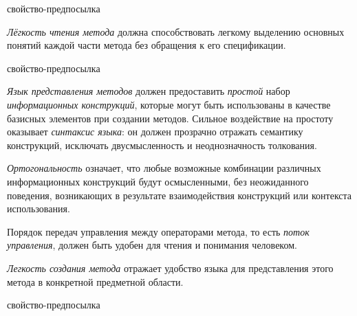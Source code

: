 \begin{SCn}
\begin{scnrelfromlist}{свойство-предпосылка}
\end{scnrelfromlist}
\end{SCn}

\textit{Лёгкость чтения метода} должна способствовать легкому выделению основных понятий каждой части метода без обращения к его спецификации.

\begin{SCn}
\begin{scnrelfromlist}{свойство-предпосылка}
\end{scnrelfromlist}
\end{SCn}

\textit{Язык представления методов} должен предоставить \textit{простой} набор \textit{информационных конструкций}, которые могут быть использованы в качестве базисных элементов при создании методов.
Сильное воздействие на простоту оказывает \textit{синтаксис языка}: он должен прозрачно отражать семантику конструкций, исключать двусмысленность и неоднозначность толкования.

\textit{Ортогональность} означает, что любые возможные комбинации различных информационных конструкций будут осмысленными, без неожиданного поведения, возникающих в результате взаимодействия конструкций или контекста использования.

Порядок передач управления между операторами метода, то есть \textit{поток управления}, должен быть удобен для чтения и понимания человеком.

\textit{Легкость создания метода} отражает удобство языка для представления этого метода в конкретной предметной области.

\begin{SCn}
\begin{scnrelfromlist}{свойство-предпосылка}
\end{scnrelfromlist}
\end{SCn}


